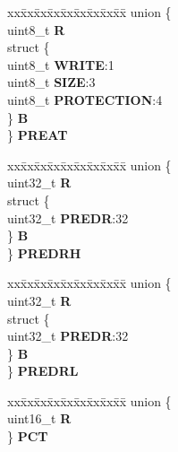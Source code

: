 \begin{DoxyCompactItemize}
\begin{tabbing}
\end{tabbing}\item 
\mbox{\label{structECSM__tag_a99e4d41fccea965ba4c2641b0133ed06}} 
\begin{tabbing}
xx\=xx\=xx\=xx\=xx\=xx\=xx\=xx\=xx\=\kill
union \{\\
\>uint8\_t {\bfseries R}\\
\>struct \{\\
\>\>uint8\_t {\bfseries WRITE}:1\\
\>\>uint8\_t {\bfseries SIZE}:3\\
\>\>uint8\_t {\bfseries PROTECTION}:4\\
\>\} {\bfseries B}\\
\} {\bfseries PREAT}\\

\end{tabbing}\item 
\mbox{\label{structECSM__tag_adce2662e44dfde4a7baa5946bc2e3650}} 
\begin{tabbing}
xx\=xx\=xx\=xx\=xx\=xx\=xx\=xx\=xx\=\kill
union \{\\
\>uint32\_t {\bfseries R}\\
\>struct \{\\
\>\>uint32\_t {\bfseries PREDR}:32\\
\>\} {\bfseries B}\\
\} {\bfseries PREDRH}\\

\end{tabbing}\item 
\mbox{\label{structECSM__tag_a9bc1784be51e6f154d2d668049678d7d}} 
\begin{tabbing}
xx\=xx\=xx\=xx\=xx\=xx\=xx\=xx\=xx\=\kill
union \{\\
\>uint32\_t {\bfseries R}\\
\>struct \{\\
\>\>uint32\_t {\bfseries PREDR}:32\\
\>\} {\bfseries B}\\
\} {\bfseries PREDRL}\\

\end{tabbing}\item 
\mbox{\label{structECSM__tag_a3b3766c3b6cdb3a5e9c0e96882162b50}} 
\begin{tabbing}
xx\=xx\=xx\=xx\=xx\=xx\=xx\=xx\=xx\=\kill
union \{\\
\>uint16\_t {\bfseries R}\\
\} {\bfseries PCT}\\


\end{tabbing}
\end{DoxyCompactItemize}
